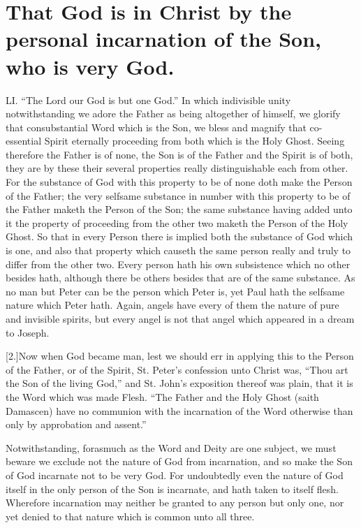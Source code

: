 \section*{That God is in Christ by the personal incarnation of the Son, who is very God.}
LI. “The Lord our God is but one God.” In which indivisible unity notwithstanding we adore the Father as being altogether of himself, we glorify that consubstantial Word which is the Son, we bless and magnify that co-essential Spirit eternally proceeding from both which is the Holy Ghost. Seeing therefore the Father is of none, the Son is of the Father and the Spirit is of both, they are by these their several properties really distinguishable each from other. For the substance of God with this property to be of none doth make the Person of the Father; the very selfsame substance in number with this property to be of the Father maketh the Person of the Son; the same substance having added unto it the property of proceeding from the other two maketh the Person of the Holy Ghost. So that in every Person there is implied both the substance of God which is one, and  also that property which causeth the same person really and truly to differ from the other two.
 Every person hath his own subsistence which no other besides hath, although there be others besides that are of the same substance. As no man but Peter can be the person which Peter is, yet Paul hath the selfsame nature which Peter hath. Again, angels have every of them the nature of pure and invisible spirits, but every angel is not that angel which appeared in a dream to Joseph.

[2.]Now when God became man, lest we should err in applying this to the Person of the Father, or of the Spirit, St. Peter’s confession unto Christ was, “Thou art the Son of the living God,” and St. John’s exposition thereof was plain, that it is the Word which was made Flesh. “The Father and the Holy Ghost (saith Damascen) have no communion with the incarnation of the Word otherwise than only by approbation and assent.”

Notwithstanding, forasmuch as the Word and Deity are one subject, we must beware we exclude not the nature of God from incarnation, and so make the Son of God incarnate not to be very God. For undoubtedly even the nature of God itself in the only person of the Son is incarnate, and hath taken to itself flesh. Wherefore incarnation may neither be granted to any person but only one, nor yet denied to that nature which is common unto all three.

